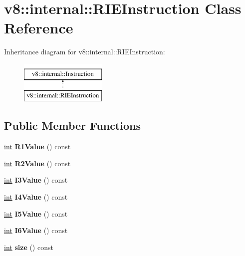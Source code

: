 \hypertarget{classv8_1_1internal_1_1RIEInstruction}{}\section{v8\+:\+:internal\+:\+:R\+I\+E\+Instruction Class Reference}
\label{classv8_1_1internal_1_1RIEInstruction}
Inheritance diagram for v8\+:\+:internal\+:\+:R\+I\+E\+Instruction\+:\begin{figure}[H]
\begin{center}
\leavevmode
\includegraphics[height=2.000000cm]{classv8_1_1internal_1_1RIEInstruction}
\end{center}
\end{figure}
\subsection*{Public Member Functions}
\begin{DoxyCompactItemize}
\item 
\mbox{\label{classv8_1_1internal_1_1RIEInstruction_a59eba4fc8d33ad8070fac1d990601d1b}} 
\mbox{\hyperlink{classint}{int}} {\bfseries R1\+Value} () const
\item 
\mbox{\label{classv8_1_1internal_1_1RIEInstruction_af37ce4f310ea977b2f94849de911ff4a}} 
\mbox{\hyperlink{classint}{int}} {\bfseries R2\+Value} () const
\item 
\mbox{\label{classv8_1_1internal_1_1RIEInstruction_ab3a699bb3d23027f618a69f0cacf8f9a}} 
\mbox{\hyperlink{classint}{int}} {\bfseries I3\+Value} () const
\item 
\mbox{\label{classv8_1_1internal_1_1RIEInstruction_ab44c478e8d4f7cc0beecab020ae52872}} 
\mbox{\hyperlink{classint}{int}} {\bfseries I4\+Value} () const
\item 
\mbox{\label{classv8_1_1internal_1_1RIEInstruction_a44c83d7a34f52159fa27feff2e855e2e}} 
\mbox{\hyperlink{classint}{int}} {\bfseries I5\+Value} () const
\item 
\mbox{\label{classv8_1_1internal_1_1RIEInstruction_a2a842f7b9b1983755f37f1f2251d0ec4}} 
\mbox{\hyperlink{classint}{int}} {\bfseries I6\+Value} () const
\item 
\mbox{\label{classv8_1_1internal_1_1RIEInstruction_acc78ee1a4dfb53ac120fa13992370eb7}} 
\mbox{\hyperlink{classint}{int}} {\bfseries size} () const
\end{DoxyCompactItemize}


